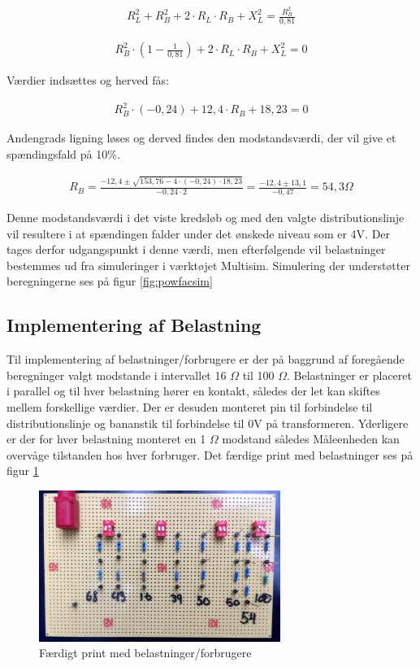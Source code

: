 \begin{align}
R_L^2+R_B^2+2\cdot R_L\cdot R_B+X_L^2=\frac{R_B^2}{0,81}
\end{align}

\begin{align}
R_B^2\cdot (1-\frac{1}{0,81})+2\cdot R_L\cdot R_B+X_L^2=0
\end{align}

Værdier indsættes og herved fås:

\begin{align}
R_B^2\cdot (-0,24) +12,4\cdot R_B+18,23=0
\end{align}

Andengrads ligning løses og derved findes den modstandsværdi, der vil give et spændingsfald på 10\%.

\begin{align}
R_B=\frac{-12,4\pm\sqrt{153,76-4\cdot(-0,24)\cdot18,23}}{-0,24\cdot 2}=\frac{-12,4\pm 13,1}{-0,47}=54,3 \Omega
\end{align}

Denne modstandsværdi i det viste kredsløb og med den valgte distributionslinje vil resultere i at spændingen falder under det ønskede niveau som er 4V. Der tages derfor udgangspunkt i denne værdi, men efterfølgende vil belastninger bestemmes ud fra simuleringer i værktøjet Multisim. Simulering der understøtter beregningerne ses på figur \ref{fig:powfacsim}

\subsection{Implementering af Belastning}
\label{subsec:implementeringAfBelastning}
Til implementering af belastninger/forbrugere er der på baggrund af foregående beregninger valgt modstande i intervallet 16 $\Omega$ til 100 $\Omega$. Belastninger er placeret i parallel og til hver belastning hører en kontakt, således der let kan skiftes mellem forskellige værdier. Der er desuden monteret pin til forbindelse til distributionslinje og bananstik til forbindelse til 0V på transformeren. Yderligere er der for hver belastning monteret en 1 $\Omega$ modstand således Måleenheden kan overvåge tilstanden hos hver forbruger. Det færdige print med belastninger ses på figur \ref{fig:Belastning1}

\begin{figure}[H] 
	\centering
	\includegraphics[width=0.7\textwidth]{Figure/Belastningskreds}
	\caption{Færdigt print med belastninger/forbrugere}
	\label{fig:Belastning1}
\end{figure}


